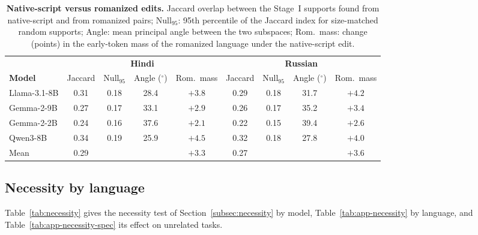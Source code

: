 \begin{table}[!htbp]
  \centering
  \footnotesize
  \setlength{\tabcolsep}{4pt}
  \begin{tabular}{@{}l cccc cccc@{}}
    \toprule
    & \multicolumn{4}{c}{\textbf{Hindi}} & \multicolumn{4}{c}{\textbf{Russian}} \\
    \cmidrule(lr){2-5}\cmidrule(l){6-9}
    \textbf{Model} & Jaccard & Null$_{95}$ & Angle ($^\circ$) & Rom.\ mass & Jaccard & Null$_{95}$ & Angle ($^\circ$) & Rom.\ mass \\
    \midrule
    Llama-3.1-8B & 0.31 & 0.18 & 28.4 & $+3.8$ & 0.29 & 0.18 & 31.7 & $+4.2$ \\
    Gemma-2-9B & 0.27 & 0.17 & 33.1 & $+2.9$ & 0.26 & 0.17 & 35.2 & $+3.4$ \\
    Gemma-2-2B & 0.24 & 0.16 & 37.6 & $+2.1$ & 0.22 & 0.15 & 39.4 & $+2.6$ \\
    Qwen3-8B & 0.34 & 0.19 & 25.9 & $+4.5$ & 0.32 & 0.18 & 27.8 & $+4.0$ \\
    \midrule
    Mean & 0.29 & & & $+3.3$ & 0.27 & & & $+3.6$ \\
    \bottomrule
  \end{tabular}
  \caption{\textbf{Native-script versus romanized edits.} Jaccard overlap between the Stage~I supports found from native-script and from romanized pairs; Null$_{95}$: 95th percentile of the Jaccard index for size-matched random supports; Angle: mean principal angle between the two subspaces; Rom.\ mass: change (points) in the early-token mass of the romanized language under the native-script edit.}
  \label{tab:app-romanized}
\end{table}

\FloatBarrier
\subsection{Necessity by language}

Table~\ref{tab:necessity} gives the necessity test of Section~\ref{subsec:necessity} by model, Table~\ref{tab:app-necessity} by language, and Table~\ref{tab:app-necessity-spec} its effect on unrelated tasks.

